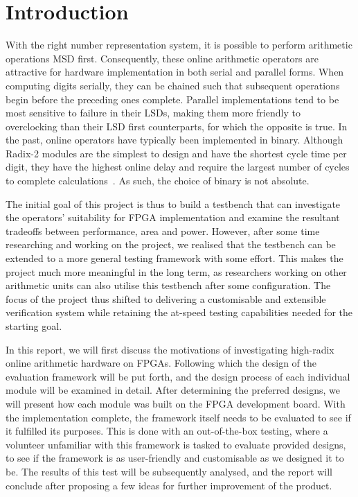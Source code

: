 \chapter{Introduction}

With the right number representation system, it is possible to perform arithmetic operations MSD first.
Consequently, these online arithmetic operators are attractive for hardware implementation in both serial and parallel forms.
When computing digits serially, they can be chained such that subsequent operations begin before the preceding ones complete.
Parallel implementations tend to be most sensitive to failure in their LSDs, making them more friendly to overclocking than their LSD first counterparts, for which the opposite is true.
In the past, online operators have typically been implemented in binary.
Although Radix-2 modules are the simplest to design and have the shortest cycle time per digit, they have the highest online delay and require the largest number of cycles to complete calculations~\cite{Tenca1}.
As such, the choice of binary is not absolute.

The initial goal of this project is thus to build a testbench that can investigate the operators' suitability for FPGA implementation and examine the resultant tradeoffs between performance, area and power.
However, after some time researching and working on the project, we realised that the testbench can be extended to a more general testing framework with some effort.
This makes the project much more meaningful in the long term, as researchers working on other arithmetic units can also utilise this testbench after some configuration.
The focus of the project thus shifted to delivering a customisable and extensible verification system while retaining the at-speed testing capabilities needed for the starting goal.

In this report, we will first discuss the motivations of investigating high-radix online arithmetic hardware on FPGAs.
Following which the design of the evaluation framework will be put forth, and the design process of each individual module will be examined in detail.
After determining the preferred designs, we will present how each module was built on the FPGA development board.
With the implementation complete, the framework itself needs to be evaluated to see if it fulfilled its purposes.
This is done with an out-of-the-box testing, where a volunteer unfamiliar with this framework is tasked to evaluate provided designs, to see if the framework is as user-friendly and customisable as we designed it to be.
The results of this test will be subsequently analysed, and the report will conclude after proposing a few ideas for further improvement of the product.
